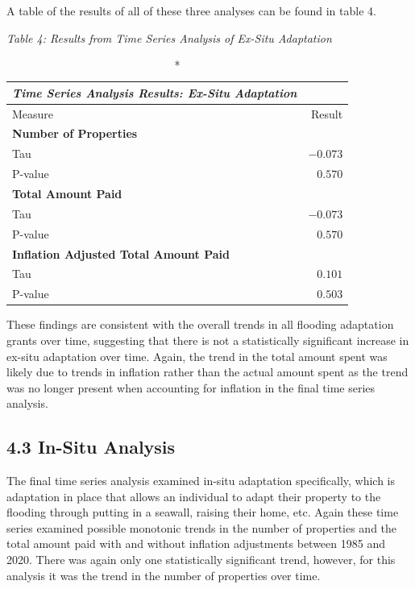 \documentclass[
  12pt,
]{article}
\begin{document}
A table of the results of all of these three analyses can be found in
table 4. \newline

\newpage

\emph{Table 4: Results from Time Series Analysis of Ex-Situ
Adaptation}\\
\captionsetup[table]{labelformat=empty,skip=1pt}

\begin{longtable}{lr}
\caption*{
{\large \emph{\textbf{Time Series Analysis Results: Ex-Situ Adaptation}}}
} \\ 
\toprule
Measure & Result \\ 
\midrule
\multicolumn{1}{l}{\textbf{Number of Properties}} \\ 
\midrule
Tau & $-0.073$ \\ 
P-value & $0.570$ \\ 
\midrule
\multicolumn{1}{l}{\textbf{Total Amount Paid}} \\ 
\midrule
Tau & $-0.073$ \\ 
P-value & $0.570$ \\ 
\midrule
\multicolumn{1}{l}{\textbf{Inflation Adjusted Total Amount Paid}} \\ 
\midrule
Tau & $0.101$ \\ 
P-value & $0.503$ \\ 
\bottomrule
\end{longtable}

These findings are consistent with the overall trends in all flooding
adaptation grants over time, suggesting that there is not a
statistically significant increase in ex-situ adaptation over time.
Again, the trend in the total amount spent was likely due to trends in
inflation rather than the actual amount spent as the trend was no longer
present when accounting for inflation in the final time series
analysis.\\
\newline

\hypertarget{in-situ-analysis}{%
\subsection{4.3 In-Situ Analysis}\label{in-situ-analysis}}

The final time series analysis examined in-situ adaptation specifically,
which is adaptation in place that allows an individual to adapt their
property to the flooding through putting in a seawall, raising their
home, etc. Again these time series examined possible monotonic trends in
the number of properties and the total amount paid with and without
inflation adjustments between 1985 and 2020. There was again only one
statistically significant trend, however, for this analysis it was the
trend in the number of properties over time.
\end{document}

